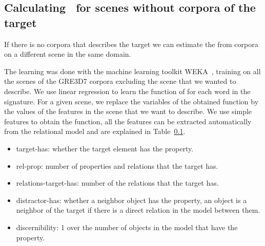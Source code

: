 
\subsection{Calculating \puse\ for scenes without corpora of the target}

If there is no corpora that describes the target we can estimate the \puse from corpora on a different scene in the same domain. 


The learning was done with the machine learning toolkit WEKA~\cite{Hall:WEK09}, training on all the scenes of the GRE3D7 corpora excluding the scene that we wanted  to describe. We use linear regression to learn the function of \puse for each word in the signature. For a given scene, we replace the variables of the obtained function by the values of the features in the scene that we want to describe. We use simple features to obtain the function, all the features can be extracted automatically from the relational model and are explained in Table~\ref{}. 

\begin{small}
\begin{itemize}
\item target-has: whether the target element has the property.
\item rel-prop: number of properties and relations that the target has.
\item relations-target-has: number of the relations that the target has.
\item distractor-has: whether a neighbor object has the property, an object is a neighbor of the target if there is a direct relation in the model between them.
\item discernibility: 1 over the number of objects in the model that have the property.
\end{itemize}
\end{small}

